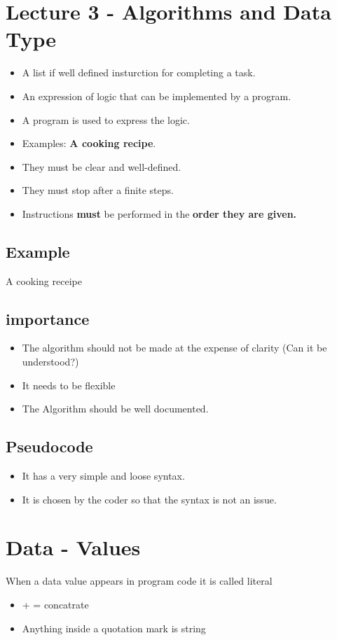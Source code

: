 \documentclass[12pt]{article}
\begin{document}
\section{Lecture 3 - Algorithms and Data Type}
\begin{itemize}
\item A list if well defined insturction for completing a task.
\item An expression of logic that can be implemented by a program.
\item A program is used to express the logic.
\item Examples: \textbf{A cooking recipe}.
\item They must be clear and well-defined.
\item They must stop after a finite steps.
\item Instructions \textbf{must} be performed in the \textbf{order they are given.}
\end{itemize}
\subsection{Example}
A cooking receipe

\subsection{importance}
\begin{itemize}
\item The algorithm should not be made at the expense of clarity (Can it be understood?)
\item It needs to be flexible
\item The Algorithm should be well documented.
\end{itemize}

\subsection{Pseudocode}
\begin{itemize}
\item It has a very simple and loose syntax.
\item It is chosen by the coder so that the syntax is not an issue.
\end{itemize}

\pagebreak 
\section{Data - Values}
When a data value appears in program code it is called literal
\begin{itemize}
\item + = concatrate
\item Anything inside a quotation mark is string
\end{itemize}
\end{document}
